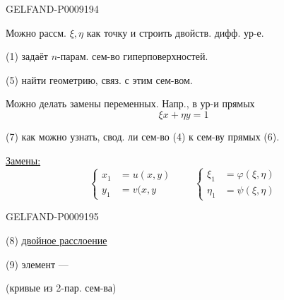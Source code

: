 \begin{GelfandAdjacentEvidence}{GELFAND-P000919}{4}


Можно рассм. $\xi,\eta$ как точку и строить двойств. дифф. ур-е.

(1) задаёт $n$-парам. сем-во гиперповерхностей.

(5)  найти геометрию, связ. с этим сем-вом.

Можно делать замены переменных. Напр., в ур-и прямых
\begin{equation*}
 \xi x+\eta y=1
 \tag{6}
\end{equation*}

(7)  как можно узнать, свод. ли сем-во (4) к сем-ву прямых (6).

\uline{Замены:}
\begin{equation*}
 \left\{\begin{aligned}
 x_1&=u(x,y)\\
 y_1&=v(x,y
 \end{aligned}\right.
 \qquad
 \left\{\begin{aligned}
 \xi_1&=\varphi(\xi,\eta)\\
 \eta_1&=\psi(\xi,\eta)
 \end{aligned}\right.
\end{equation*}
\end{GelfandAdjacentEvidence}
\begin{GelfandAdjacentEvidence}{GELFAND-P000919}{5}


(8)  \uline{двойное расслоение}

(9) элемент --- 

(кривые из 2-пар. сем-ва)

\end{GelfandAdjacentEvidence}


